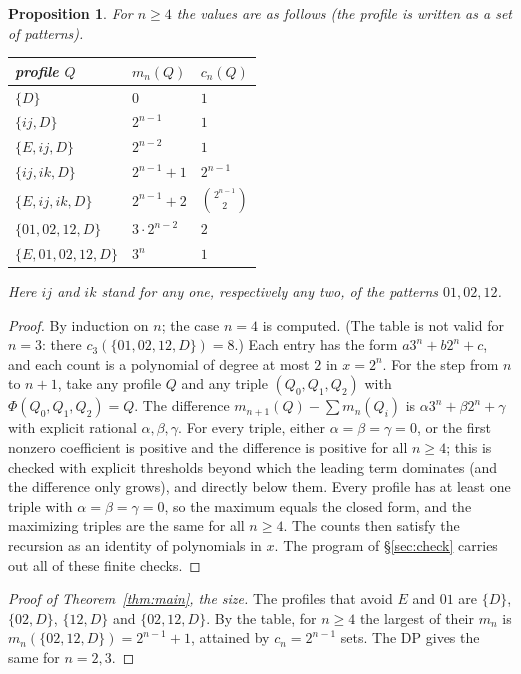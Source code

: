 \documentclass[11pt]{amsart}
\newtheorem{proposition}[theorem]{Proposition}
\theoremstyle{remark}
\begin{document}
\begin{proposition}\label{prop:table}
For $n\ge4$ the values are as follows (the profile is written as a set of patterns).
\begin{center}\small
\begin{tabular}{lll}
\toprule
profile $Q$ & $m_n(Q)$ & $c_n(Q)$\\
\midrule
$\{D\}$ & $0$ & $1$\\
$\{ij,D\}$ & $2^{n-1}$ & $1$\\
$\{E,ij,D\}$ & $2^{n-2}$ & $1$\\
$\{ij,ik,D\}$ & $2^{n-1}+1$ & $2^{n-1}$\\
$\{E,ij,ik,D\}$ & $2^{n-1}+2$ & $\binom{2^{n-1}}{2}$\\
$\{01,02,12,D\}$ & $3\cdot2^{n-2}$ & $2$\\
$\{E,01,02,12,D\}$ & $3^n$ & $1$\\
\bottomrule
\end{tabular}
\end{center}
Here $ij$ and $ik$ stand for any one, respectively any two, of the patterns $01,02,12$.
\end{proposition}
\begin{proof}
By induction on $n$; the case $n=4$ is computed. (The table is not valid for $n=3$: there
$c_3(\{01,02,12,D\})=8$.) Each entry has the form $a3^n+b2^n+c$, and each count is a polynomial of degree at most
$2$ in $x=2^n$. For the step from $n$ to $n+1$, take any profile $Q$ and any triple
$(Q_0,Q_1,Q_2)$ with $\Phi(Q_0,Q_1,Q_2)=Q$. The difference $m_{n+1}(Q)-\sum m_n(Q_i)$ is
$\alpha3^n+\beta2^n+\gamma$ with explicit rational $\alpha,\beta,\gamma$. For every triple, either
$\alpha=\beta=\gamma=0$, or the first nonzero coefficient is positive and the difference is positive for all
$n\ge4$; this is checked with explicit thresholds beyond which the leading term dominates (and the difference only
grows), and directly below them. Every profile has at least one triple with $\alpha=\beta=\gamma=0$, so the
maximum equals the closed form, and the maximizing triples are the same for all $n\ge4$. The counts then satisfy the recursion as an identity of polynomials in $x$. The program of
\S\ref{sec:check} carries out all of these finite checks.
\end{proof}

\begin{proof}[Proof of Theorem~\ref{thm:main}, the size]
The profiles that avoid $E$ and $01$ are $\{D\}$, $\{02,D\}$, $\{12,D\}$ and $\{02,12,D\}$. By the table, for
$n\ge4$ the largest of their $m_n$ is $m_n(\{02,12,D\})=2^{n-1}+1$, attained by $c_n=2^{n-1}$ sets. The DP gives the
same for $n=2,3$.
\end{proof}
\end{document}
